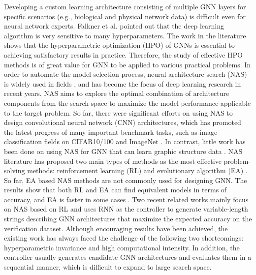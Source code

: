 \documentclass[lettersize,journal]{IEEEtran}
\begin{document}
Developing a custom learning architecture consisting of multiple GNN layers for specific scenarios (e.g., biological and physical network data) is difficult even for neural network experts. Falkner et al. \cite{20} pointed out that the deep learning algorithm is very sensitive to many hyperparameters. The work in the literature \cite{21} shows that the hyperparametric optimization (HPO) of GNNs is essential to achieving satisfactory results in practice. Therefore, the study of effective HPO methods is of great value for GNN to be applied to various practical problems. In order to automate the model selection process, neural architecture search (NAS) is widely used in fields \cite{22,23}, and has become the focus of deep learning research in recent years. NAS aims to explore the optimal combination of architecture components from the search space to maximize the model performance applicable to the target problem. So far, there were significant efforts on using NAS to design convolutional neural network (CNN) architectures, which has promoted the latest progress of many important benchmark tasks, such as image classification fields on CIFAR10/100 and ImageNet \cite{24, 25}. In contrast, little work has been done on using NAS for GNN that can learn graphic structure data \cite{26, 27, 28}. NAS literature has proposed two main types of methods as the most effective problem-solving methods: reinforcement learning (RL) and evolutionary algorithm (EA) \cite{29}. So far, EA based NAS methods are not commonly used for designing GNN. The results show that both RL and EA can find equivalent models in terms of accuracy, and EA is faster in some cases \cite{54, 10.1007/978-3-030-61377-8_21}. Two recent related works \cite{28, 30} mainly focus on NAS based on RL and uses RNN as the controller to generate variable-length strings describing GNN architectures that maximize the expected accuracy on the verification dataset. Although encouraging results have been achieved, the existing work has always faced the challenge of the following two shortcomings: hyperparametric invariance and high computational intensity. In addition, the controller usually generates candidate GNN architectures and evaluates them in a sequential manner, which is difficult to expand to large search space.
\end{document}
